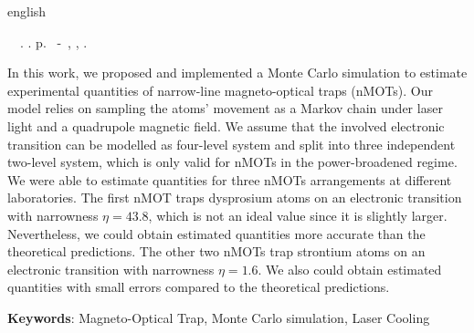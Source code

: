\begin{resumo}[Abstract]
 \begin{otherlanguage*}{english}
	\begin{flushleft} 
		\setlength{\absparsep}{0pt} %
 		\SingleSpacing  		\imprimirautorabr~~\textbf{\imprimirtitleabstract}.	\imprimirdata.  \pageref{LastPage}p. 
		\imprimirtipotrabalhoabs~-~\imprimirinstituicao, \imprimirlocal, 	\imprimirdata. 
 	\end{flushleft}
	\OnehalfSpacing 
   In this work, we proposed and implemented a Monte Carlo simulation to estimate experimental quantities of narrow-line magneto-optical traps (nMOTs). Our model relies on sampling the atoms' movement as a Markov chain under laser light and a quadrupole magnetic field. We assume that the involved electronic transition can be modelled as four-level system and split into three independent two-level system, which is only valid for nMOTs in the power-broadened regime.  We were able to estimate quantities for three nMOTs arrangements at different laboratories. The first nMOT traps dysprosium atoms on an electronic transition with narrowness $ \eta = 43.8 $, which is not an ideal value since it is slightly larger. Nevertheless, we could obtain estimated quantities more accurate than the theoretical predictions. The other two nMOTs trap strontium atoms on an electronic transition with narrowness $ \eta = 1.6 $. We also could obtain estimated quantities with small errors compared to the theoretical predictions.

   \vspace{\onelineskip}
 
   \noindent 
   \textbf{Keywords}: Magneto-Optical Trap, Monte Carlo simulation, Laser Cooling
 \end{otherlanguage*}
\end{resumo}
